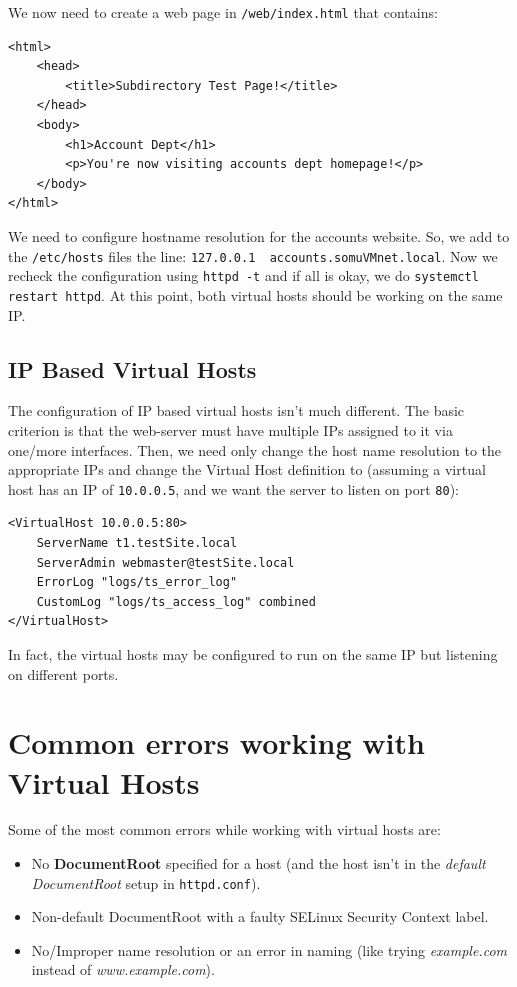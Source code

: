 \noindent
We now need to create a web page in \verb|/web/index.html| that contains:

\vspace{-15pt}
\begin{verbatim}
<html>
	<head>
		<title>Subdirectory Test Page!</title>
	</head>
	<body>
		<h1>Account Dept</h1>
		<p>You're now visiting accounts dept homepage!</p>
	</body>
</html>
\end{verbatim}
\vspace{-10pt}	

\noindent
We need to configure hostname resolution for the accounts website. So, we add to the \verb|/etc/hosts| files the line: \verb|127.0.0.1  accounts.somuVMnet.local|. Now we recheck the configuration using \verb|httpd -t| and if all is okay, we do \verb|systemctl restart httpd|.	At this point, both virtual hosts should be working on the same IP. 

\subsection{IP Based Virtual Hosts}
The configuration of IP based virtual hosts isn't much different. The basic criterion is that the web-server must have multiple IPs assigned to it via one/more interfaces. Then, we need only change the host name resolution to the appropriate IPs and change the Virtual Host definition to (assuming a virtual host has an IP of \verb|10.0.0.5|, and we want the server to listen on port \verb|80|):

\vspace{-15pt}
\begin{verbatim}
<VirtualHost 10.0.0.5:80>
	ServerName t1.testSite.local
	ServerAdmin webmaster@testSite.local			
	ErrorLog "logs/ts_error_log"
	CustomLog "logs/ts_access_log" combined
</VirtualHost>
\end{verbatim}
\vspace{-10pt}	

\noindent
In fact, the virtual hosts may be configured to run on the same IP but listening on different ports.

\section{Common errors working with Virtual Hosts}
Some of the most common errors while working with virtual hosts are:

\begin{itemize}
	\item No \textbf{DocumentRoot} specified for a host (and the host isn't in the \textit{default DocumentRoot} setup in \verb|httpd.conf|).
	\item Non-default DocumentRoot with a faulty SELinux Security Context label. 
	\item No/Improper name resolution or an error in naming (like trying \textit{example.com} instead of \textit{www.example.com}). 
\end{itemize}

